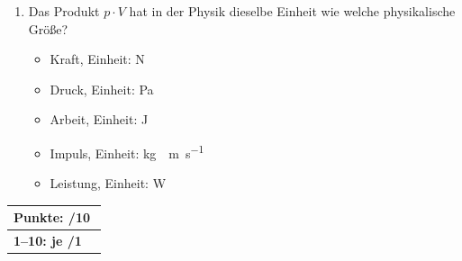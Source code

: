 \documentclass[11pt, a4paper]{article}
\begin{document}
\begin{enumerate}[label=\arabic*.,itemsep=18pt]
    \item Das Produkt $p \cdot V$ hat in der Physik dieselbe Einheit wie welche physikalische Größe?
    \begin{itemize}[label={$\square$},itemsep=1pt,topsep=0pt]
        \item Kraft, Einheit: \si{\newton}
        \item Druck, Einheit: \si{\pascal}
        \item Arbeit, Einheit: \si{\joule}
        \item Impuls, Einheit: \si{\kilogram\cdot \metre\per\second}
        \item Leistung, Einheit: \si{\watt}
    \end{itemize}
\end{enumerate}

\vfill
\begin{flushright}
\renewcommand{\arraystretch}{1.23}
\begin{tabular}{|l c|}
\hline
\multicolumn{2}{|l|}{\textbf{\large{Punkte: \quad\quad\quad /10}}}\\
\hline
\textbf{1--10: je /1} & \\
\hline
\end{tabular}
\end{flushright}
\end{document}
